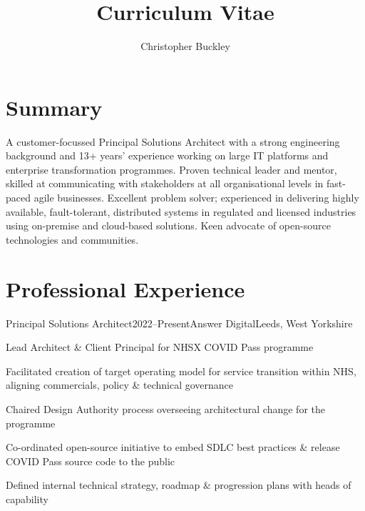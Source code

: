 \documentclass{cv}
\title{Curriculum Vitae}
\author{Christopher Buckley}
\begin{document}

\section{Summary}

A customer-focussed Principal Solutions Architect with a strong engineering background and 13+ years'
experience working on large IT platforms and enterprise transformation programmes. Proven technical
leader and mentor, skilled at communicating with stakeholders at all organisational levels in
fast-paced agile businesses. Excellent problem solver; experienced in delivering highly available,
fault-tolerant, distributed systems in regulated and licensed industries using on-premise and
cloud-based solutions. Keen advocate of open-source technologies and communities.


\section{Professional Experience}

\begin{experience}{Principal Solutions Architect}{2022--Present}{Answer Digital}{Leeds, West Yorkshire}
\item Lead Architect \& Client Principal for NHSX COVID Pass programme
\item Facilitated creation of target operating model for service transition within NHS, aligning commercials,
      policy \& technical governance
\item Chaired Design Authority process overseeing architectural change for the programme
\item Co-ordinated open-source initiative to embed SDLC best practices \& release COVID Pass source code
      to the public
\item Defined internal technical strategy, roadmap \& progression plans with heads of capability
\end{experience}

\end{document}

